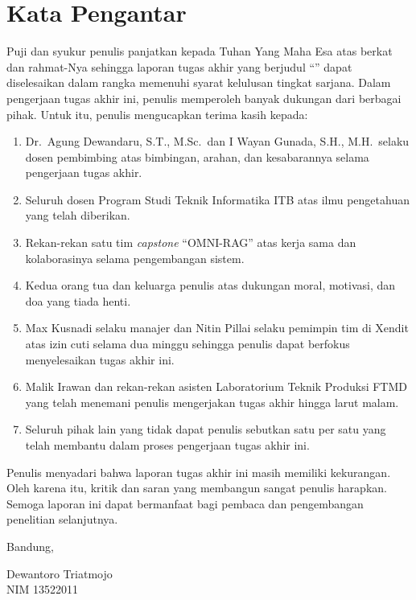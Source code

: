 \chapter*{Kata Pengantar}

Puji dan syukur penulis panjatkan kepada Tuhan Yang Maha Esa atas berkat dan rahmat-Nya sehingga laporan tugas akhir yang berjudul ``\thetitle'' dapat diselesaikan dalam rangka memenuhi syarat kelulusan tingkat sarjana. Dalam pengerjaan tugas akhir ini, penulis memperoleh banyak dukungan dari berbagai pihak. Untuk itu, penulis mengucapkan terima kasih kepada:

\begin{enumerate}
  \item Dr.\ Agung Dewandaru, S.T., M.Sc.\ dan I Wayan Gunada, S.H., M.H.\ selaku dosen pembimbing atas bimbingan, arahan, dan kesabarannya selama pengerjaan tugas akhir.
  \item Seluruh dosen Program Studi Teknik Informatika ITB atas ilmu pengetahuan yang telah diberikan.
  \item Rekan-rekan satu tim \textit{capstone} ``OMNI-RAG'' atas kerja sama dan kolaborasinya selama pengembangan sistem.
  \item Kedua orang tua dan keluarga penulis atas dukungan moral, motivasi, dan doa yang tiada henti.
  \item Max Kusnadi selaku manajer dan Nitin Pillai selaku pemimpin tim di Xendit atas izin cuti selama dua minggu sehingga penulis dapat berfokus menyelesaikan tugas akhir ini.
  \item Malik Irawan dan rekan-rekan asisten Laboratorium Teknik Produksi FTMD yang telah menemani penulis mengerjakan tugas akhir hingga larut malam.
  \item Seluruh pihak lain yang tidak dapat penulis sebutkan satu per satu yang telah membantu dalam proses pengerjaan tugas akhir ini.
\end{enumerate}

Penulis menyadari bahwa laporan tugas akhir ini masih memiliki kekurangan. Oleh karena itu, kritik dan saran yang membangun sangat penulis harapkan. Semoga laporan ini dapat bermanfaat bagi pembaca dan pengembangan penelitian selanjutnya.

\begin{flushright}
  \vspace{0.5cm}
  Bandung, \tanggalpengesahan

  \vspace{1.5cm}

  Dewantoro Triatmojo \\
  NIM 13522011
\end{flushright}
